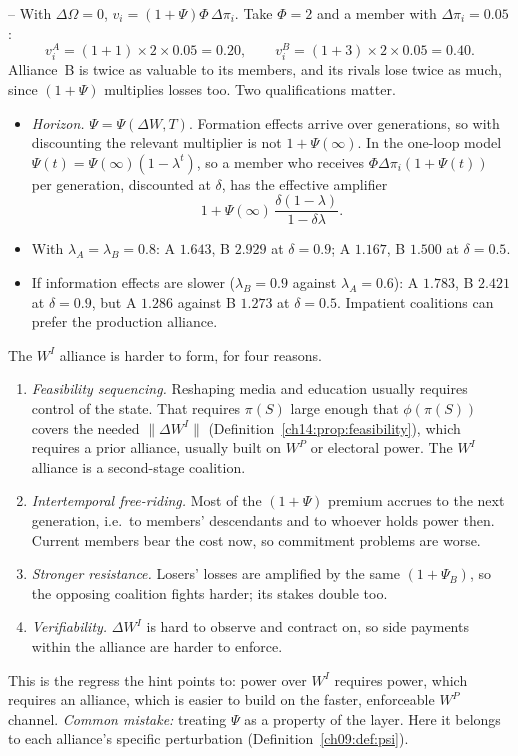 \documentclass[../solutions_manual.tex]{subfiles}
\begin{document}
-- With $\Delta\Omega = 0$, $v_i = (1+\Psi)\Phi\,\Delta\pi_i$. Take $\Phi = 2$ and a member with $\Delta\pi_i = 0.05$:
\[
v_i^A = (1+1)\times 2\times 0.05 = 0.20, \qquad v_i^B = (1+3)\times 2\times 0.05 = 0.40 .
\]
Alliance~B is twice as valuable to its members, and its rivals lose twice as much, since $(1+\Psi)$ multiplies losses too. Two qualifications matter.
\begin{itemize}
\item \emph{Horizon.} $\Psi = \Psi(\Delta W, T)$. Formation effects arrive over generations, so with discounting the relevant multiplier is not $1 + \Psi(\infty)$. In the one-loop model $\Psi(t) = \Psi(\infty)(1 - \lambda^t)$, so a member who receives $\Phi\Delta\pi_i(1 + \Psi(t))$ per generation, discounted at $\delta$, has the effective amplifier
\[
1 + \Psi(\infty)\,\frac{\delta(1-\lambda)}{1 - \delta\lambda}.
\]
\item With $\lambda_A = \lambda_B = 0.8$: A $1.643$, B $2.929$ at $\delta = 0.9$; A $1.167$, B $1.500$ at $\delta = 0.5$.
\item If information effects are slower ($\lambda_B = 0.9$ against $\lambda_A = 0.6$): A $1.783$, B $2.421$ at $\delta = 0.9$, but A $1.286$ against B $1.273$ at $\delta = 0.5$. Impatient coalitions can prefer the production alliance.
\end{itemize}

 The $W^I$ alliance is harder to form, for four reasons.
\begin{enumerate}
\item \emph{Feasibility sequencing.} Reshaping media and education usually requires control of the state. That requires $\pi(S)$ large enough that $\phi(\pi(S))$ covers the needed $\|\Delta W^I\|$ (Definition~\ref{ch14:prop:feasibility}), which requires a prior alliance, usually built on $W^P$ or electoral power. The $W^I$ alliance is a second-stage coalition.
\item \emph{Intertemporal free-riding.} Most of the $(1+\Psi)$ premium accrues to the next generation, i.e.\ to members' descendants and to whoever holds power then. Current members bear the cost now, so commitment problems are worse.
\item \emph{Stronger resistance.} Losers' losses are amplified by the same $(1+\Psi_B)$, so the opposing coalition fights harder; its stakes double too.
\item \emph{Verifiability.} $\Delta W^I$ is hard to observe and contract on, so side payments within the alliance are harder to enforce.
\end{enumerate}
This is the regress the hint points to: power over $W^I$ requires power, which requires an alliance, which is easier to build on the faster, enforceable $W^P$ channel. \textit{Common mistake:} treating $\Psi$ as a property of the layer. Here it belongs to each alliance's specific perturbation (Definition~\ref{ch09:def:psi}).
\end{document}
